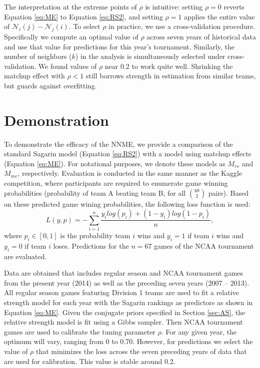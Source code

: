 \documentclass[letterpaper,12pt]{article}
\begin{document}
The interpretation at the extreme points of $\rho$ is intuitive: setting $\rho = 0$ reverts Equation \ref{eq:ME} to Equation \ref{eq:RS2}, and setting $\rho = 1$ applies the entire value of $\mathcal{N}_i(j) -\mathcal{N}_j(i)$. To select $\rho$ in practice, we use a cross-validation procedure. Specifically we compute an optimal value of $\rho$ across seven years of historical data and use that value for predictions for this year's tournament. Similarly, the number of neighbors ($k$) in the analysis is simultaneously selected under cross-validation. We found values of $\rho$ near 0.2 to work quite well. Shrinking the matchup effect with $\rho <1$ still borrows strength in estimation from similar teams, but guards against overfitting.


\section{Demonstration \label{sec:demon}}
To demonstrate the efficacy of the NNME, we provide a comparison of the standard Sagarin model (Equation \ref{eq:RS2}) with a model using matchup effects (Equation \ref{eq:ME}). For notational purposes, we denote these models as $M_{rs}$ and $M_{me}$, respectively. Evaluation is conducted in the same manner as the Kaggle competition, where participants are required to enumerate game winning probabilities (probability of team A beating team B, for all $68 \choose 2$ pairs). Based on these predicted game wining probabilities, the following loss function is used:
\begin{equation}\label{eq:kaggle_score}
L(y,p)=-\sum_{i=1}^n\frac{y_ilog(p_i)+ (1-y_i)log(1-p_i)}{n},
\end{equation}
where $p_i\in[0,1]$ is the probability team $i$ wins and $y_i=1$ if team $i$ wins and $y_i = 0$ if team $i$ loses. Predictions for the $n=67$ games of the NCAA tournament are evaluated.

Data are obtained that includes regular season and NCAA tournament games from the present year (2014) as well as the preceding seven years (2007 -- 2013). All regular season games featuring Division 1 teams are used to fit a relative strength model for each year with the Sagarin rankings as predictors as shown in Equation \ref{eq:ME}. Given the conjugate priors specified in Section \ref{sec:AS}, the relative strength model is fit using a Gibbs sampler. Then NCAA tournament games are used to calibrate the tuning parameter $\rho$. For any given year, the optimum will vary, ranging from 0 to 0.70. However, for predictions we select the value of $\rho$ that minimizes the loss across the seven preceding years of data that are used for calibration. This value is stable around 0.2.
\end{document}
